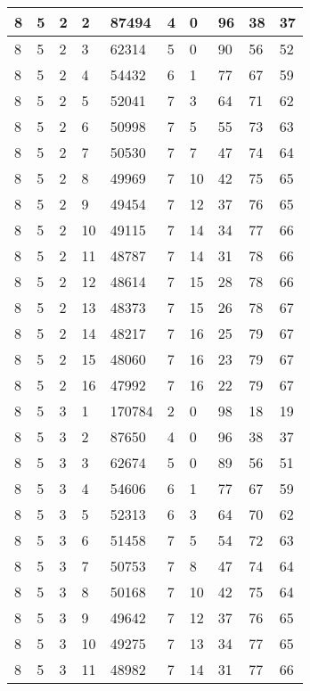 \begin{table}[!ht]
\begin{tabular}{|l|l|l|l|l|l|l|l|l|l|}
        8 & 5 & 2 & 2 & 87494 & 4 & 0 & 96 & 38 & 37 \\ \hline
        8 & 5 & 2 & 3 & 62314 & 5 & 0 & 90 & 56 & 52 \\ \hline
        8 & 5 & 2 & 4 & 54432 & 6 & 1 & 77 & 67 & 59 \\ \hline
        8 & 5 & 2 & 5 & 52041 & 7 & 3 & 64 & 71 & 62 \\ \hline
        8 & 5 & 2 & 6 & 50998 & 7 & 5 & 55 & 73 & 63 \\ \hline
        8 & 5 & 2 & 7 & 50530 & 7 & 7 & 47 & 74 & 64 \\ \hline
        8 & 5 & 2 & 8 & 49969 & 7 & 10 & 42 & 75 & 65 \\ \hline
        8 & 5 & 2 & 9 & 49454 & 7 & 12 & 37 & 76 & 65 \\ \hline
        8 & 5 & 2 & 10 & 49115 & 7 & 14 & 34 & 77 & 66 \\ \hline
        8 & 5 & 2 & 11 & 48787 & 7 & 14 & 31 & 78 & 66 \\ \hline
        8 & 5 & 2 & 12 & 48614 & 7 & 15 & 28 & 78 & 66 \\ \hline
        8 & 5 & 2 & 13 & 48373 & 7 & 15 & 26 & 78 & 67 \\ \hline
        8 & 5 & 2 & 14 & 48217 & 7 & 16 & 25 & 79 & 67 \\ \hline
        8 & 5 & 2 & 15 & 48060 & 7 & 16 & 23 & 79 & 67 \\ \hline
        8 & 5 & 2 & 16 & 47992 & 7 & 16 & 22 & 79 & 67 \\ \hline
        8 & 5 & 3 & 1 & 170784 & 2 & 0 & 98 & 18 & 19 \\ \hline
        8 & 5 & 3 & 2 & 87650 & 4 & 0 & 96 & 38 & 37 \\ \hline
        8 & 5 & 3 & 3 & 62674 & 5 & 0 & 89 & 56 & 51 \\ \hline
        8 & 5 & 3 & 4 & 54606 & 6 & 1 & 77 & 67 & 59 \\ \hline
        8 & 5 & 3 & 5 & 52313 & 6 & 3 & 64 & 70 & 62 \\ \hline
        8 & 5 & 3 & 6 & 51458 & 7 & 5 & 54 & 72 & 63 \\ \hline
        8 & 5 & 3 & 7 & 50753 & 7 & 8 & 47 & 74 & 64 \\ \hline
        8 & 5 & 3 & 8 & 50168 & 7 & 10 & 42 & 75 & 64 \\ \hline
        8 & 5 & 3 & 9 & 49642 & 7 & 12 & 37 & 76 & 65 \\ \hline
        8 & 5 & 3 & 10 & 49275 & 7 & 13 & 34 & 77 & 65 \\ \hline
        8 & 5 & 3 & 11 & 48982 & 7 & 14 & 31 & 77 & 66 \\ \hline

\end{tabular}
\end{table}
